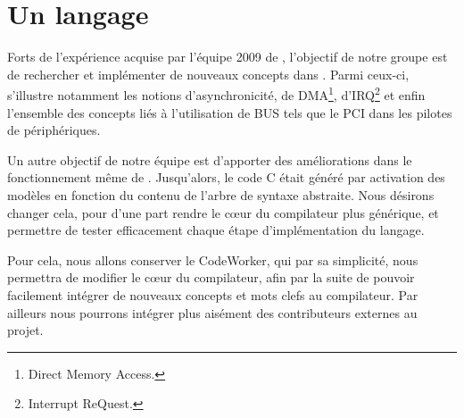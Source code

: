 \documentclass{rtxreport}
\begin{document}
\section{Un langage}

Forts de l'expérience acquise par l'équipe 2009 de \rtx, l'objectif de
notre groupe est de rechercher et implémenter de nouveaux concepts dans
\rtx. Parmi ceux-ci, s'illustre notamment les notions d'asynchronicité,
de DMA\footnote{Direct Memory Access.}, d'IRQ\footnote{Interrupt ReQuest.} et
enfin l'ensemble des concepts liés à l'utilisation de BUS tels que le PCI dans
les pilotes de périphériques.

Un autre objectif de notre équipe est d'apporter des améliorations dans le
fonctionnement même de \rtx. Jusqu'alors, le code C était généré par
activation des modèles en fonction du contenu de l'arbre de syntaxe abstraite.
Nous désirons changer cela, pour d'une part rendre le cœur du compilateur
plus générique, et permettre de tester efficacement chaque étape
d'implémentation du langage.

Pour cela, nous allons conserver le CodeWorker, qui par sa simplicité, nous
permettra de modifier le cœur du compilateur, afin par la suite de pouvoir
facilement intégrer de nouveaux concepts et mots clefs au compilateur. Par
ailleurs nous pourrons intégrer plus aisément des contributeurs externes au
projet.

\newpage

\rtxbibliography
\end{document}
